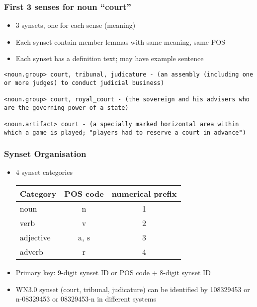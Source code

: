\begin{frame}[fragile]
\frametitle{First 3 senses for noun ``court''}

\begin{itemize}
	\item 3 synsets, one for each sense (meaning)
	\item Each synset contain member lemmas with same meaning, same POS
	\item Each synset has a definition text; may have example sentence
\end{itemize}

\bigskip

\begin{lstlisting}
<noun.group> court, tribunal, judicature - (an assembly (including one or more judges) to conduct judicial business)

<noun.group> court, royal_court - (the sovereign and his advisers who are the governing power of a state)

<noun.artifact> court - (a specially marked horizontal area within which a game is played; "players had to reserve a court in advance")
\end{lstlisting}

\end{frame}


\begin{frame}
\frametitle{Synset Organisation}
    
\begin{itemize}
\item 4 synset categories

\bigskip

\begin{center}
\begin{tabular}{l >{\ttfamily}c c}
\toprule
Category & POS code & numerical prefix\\
\midrule
noun & n & 1 \\
verb & v & 2 \\
adjective & a, s & 3 \\
adverb & r & 4 \\
\bottomrule
\end{tabular}
\end{center}

\bigskip

\item Primary key: 9-digit synset ID \alert{or} POS code + 8-digit synset ID
\item WN3.0 synset (court, tribunal, judicature) can be identified by \alert{108329453} or \alert{n-08329453} or \alert{08329453-n} in different systems
\end{itemize}
\end{frame}

